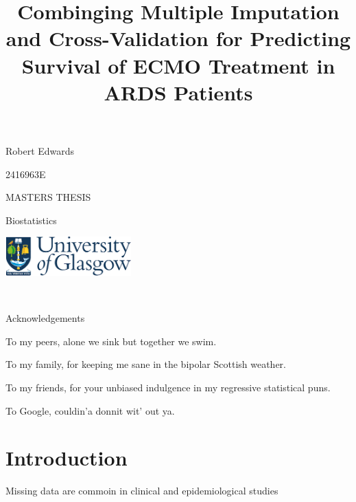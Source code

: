 \documentclass[12pt,]{article}
\title{Combinging Multiple Imputation and Cross-Validation for Predicting
Survival of ECMO Treatment in ARDS Patients}
\author{}
\date{}
\begin{document}
\maketitle

\vspace{4cm}

\begin{center}
Robert Edwards 

\vspace{0.125cm}
2416963E


\vspace{1cm}
MASTERS THESIS 

\vspace{0.125cm}
Biostatistics

\vspace{9cm}
  \includegraphics[height = 1.5cm]{images/GUlogo.png}
\end{center}

\newpage

\begin{center}
~
 
\vspace{5cm}
Acknowledgements 

\vspace{3cm}
To my peers, alone we sink but together we swim.

\vspace{1cm}
To my family, for keeping me sane in the bipolar Scottish weather. 

\vspace{1cm}
To my friends, for your unbiased indulgence in my regressive statistical puns. 

\vspace{1cm}
To Google, couldin'a donnit wit' out ya. 

\end{center}

\newpage 

\setcounter{tocdepth}{2} \tableofcontents  

\newpage

\section{Introduction}\label{introduction}

Missing data are commoin in clinical and epidemiological studies
\autocite{powney_review_2014} \autocite{karahalios_review_2012}
\autocite{wood_are_2004}
\end{document}
